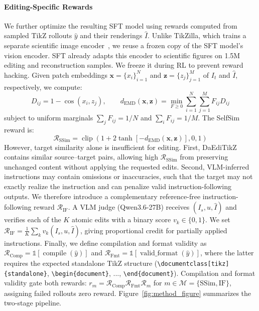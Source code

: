 \paragraph{Editing-Specific Rewards}
We further optimize the resulting SFT model using rewards computed from sampled TikZ rollouts $\hat y$ and their renderings $\hat I$. Unlike TikZilla, which trains a separate scientific image encoder~\citep{greisinger2026tikzilla}, we reuse a frozen copy of the SFT model's vision encoder. SFT already adapts this encoder to scientific figures on 1.5M editing and reconstruction samples. We freeze it during RL to prevent reward hacking. Given patch embeddings $\mathbf{x}=\{x_i\}_{i=1}^{N}$ and $\mathbf{z}=\{z_j\}_{j=1}^{M}$ of $I_t$ and $\hat I$, respectively, we compute:
\begin{equation}
D_{ij}
=
1-\cos(x_i,z_j),
\qquad
d_{\mathrm{EMD}}(\mathbf{x},\mathbf{z})
=
\min_{F\geq 0}
\sum_{i=1}^{N}\sum_{j=1}^{M}F_{ij}D_{ij}
\label{eq:selfsim_emd}
\end{equation}
subject to uniform marginals
$\sum_jF_{ij}=1/N$ and $\sum_iF_{ij}=1/M$.
The SelfSim reward is:
\begin{equation}
\mathcal{R}_{\mathrm{SSim}}
=
\operatorname{clip}
\left(
1+2\tanh[-d_{\mathrm{EMD}}(\mathbf{x},\mathbf{z})],
0,1
\right)
\label{eq:selfsim_reward}
\end{equation}
However, target similarity alone is insufficient for editing. First, DaEdiTikZ contains similar source--target pairs, allowing high $\mathcal{R}_{\mathrm{SSim}}$ from preserving unchanged content without applying the requested edits. Second, VLM-inferred instructions may contain omissions or inaccuracies, such that the target may not exactly realize the instruction and can penalize valid instruction-following outputs. We therefore introduce a complementary reference-free instruction-following reward $\mathcal{R}_{\mathrm{IF}}$. A VLM judge (Qwen3.6-27B) receives $(I_s,u,\hat I)$ and verifies each of the $K$ atomic edits with a binary score $v_k\in\{0,1\}$. We set $\mathcal{R}_{\mathrm{IF}}=\frac{1}{K}\sum_k v_k(I_s, u, \hat I)$, giving proportional credit for partially applied instructions. Finally, we define compilation and format validity as $\mathcal{R}_{\mathrm{Comp}}=\mathbb{1}[\operatorname{compile}(\hat y)]$ and $\mathcal{R}_{\mathrm{Fmt}}=\mathbb{1}[\operatorname{valid\_format}(\hat y)]$, where the latter requires the expected standalone TikZ structure (\texttt{\textbackslash documentclass[tikz]\{standalone\}}, \texttt{\textbackslash begin\{document\}}, ..., \texttt{\textbackslash end\{document\}}). Compilation and format validity gate both rewards: $r_m=\mathcal{R}_{\mathrm{Comp}}\mathcal{R}_{\mathrm{Fmt}}\mathcal{R}_m$ for $m\in\mathcal{M}=\{\mathrm{SSim},\mathrm{IF}\}$, assigning failed rollouts zero reward. Figure~\ref{fig:method_figure} summarizes the two-stage pipeline.

